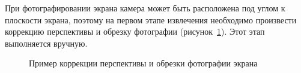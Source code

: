 \documentclass[12pt,a4paper]{article}
\begin{document}
При фотографировании экрана камера может быть расположена под углом к плоскости экрана, поэтому на первом этапе извлечения необходимо произвести коррекцию перспективы и обрезку фотографии (рисунок~\ref{fig:perspective}).
Этот этап выполняется вручную.
\begin{figure}[h]
\begin{minipage}[h]{0.49\linewidth}
\end{minipage}
\hfill
\begin{minipage}[h]{0.49\linewidth}
\end{minipage}
\caption{Пример коррекции перспективы и обрезки фотографии экрана}
\label{fig:perspective}
\end{figure}
\end{document}
